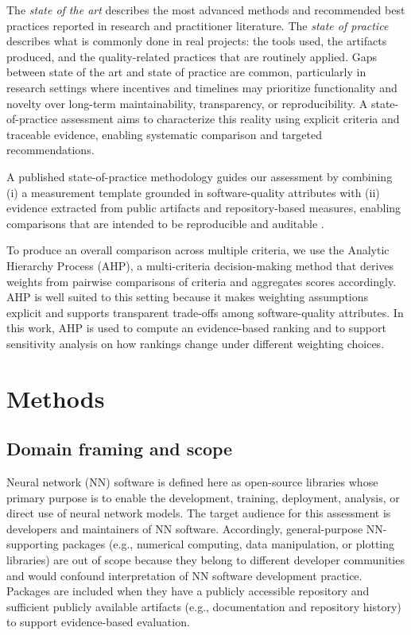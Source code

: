 \documentclass[final,1p,times,authoryear,12pt]{elsarticle}
\providecommand{\wss}[1]{\textcolor{blue}{\textit{#1}}}
\begin{document}
The \emph{state of the art} describes the most advanced methods and recommended best practices reported in research and practitioner
 literature. The \emph{state of practice} describes what is commonly done in real projects: the tools used, the artifacts produced,
  and the quality-related practices that are routinely applied. Gaps between state of the art and state of practice are common,
   particularly in research settings where incentives and timelines may prioritize functionality and
   novelty over long-term maintainability, transparency, or reproducibility.
   A state-of-practice assessment aims to characterize this reality using explicit criteria and traceable evidence,
    enabling systematic comparison and targeted recommendations.

A published state-of-practice methodology guides our
assessment by combining (i) a measurement template grounded
in software-quality attributes with (ii) evidence extracted
from public artifacts and repository-based measures,
enabling comparisons that are intended to be reproducible
and auditable \cite{MethodologyPaper}.

To produce an overall comparison across multiple criteria, we use the Analytic Hierarchy Process (AHP),
a multi-criteria decision-making method that derives weights from pairwise comparisons of criteria and aggregates scores accordingly.
AHP is well suited to this setting because it makes weighting assumptions explicit and supports transparent trade-offs
 among software-quality attributes. In this work, AHP is used to compute an evidence-based ranking and to support sensitivity analysis
  on how rankings change under different weighting choices.
\section{Methods}\label{methods}

\subsection{Domain framing and scope}\label{scope}

Neural network (NN) software is defined here as open-source libraries whose primary purpose is to enable the development,
training, deployment, analysis, or direct use of neural network models. The target audience for this assessment is developers
 and maintainers of NN software. Accordingly, general-purpose NN-supporting packages
 (e.g., numerical computing, data manipulation, or plotting libraries) are out of scope because they belong to different developer
 communities and would confound interpretation of NN software development practice.
 Packages are included when they have a publicly accessible repository and sufficient publicly available artifacts
 (e.g., documentation and repository history) to support evidence-based evaluation.
\end{document}
